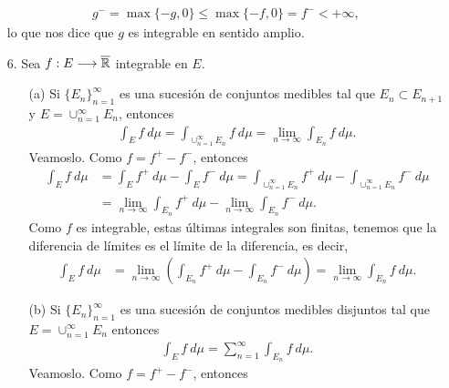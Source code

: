 \begin{obs}
\begin{enumerate}
              \begin{align*}
                  g^- = \max\{-g,0\} \leq \max\{-f,0\} = f^- < +\infty,
              \end{align*}
              lo que nos dice que $g$ es integrable en sentido amplio.
        \item[6.] Sea $f: E \longrightarrow \overline{\mathbb{R}}$ integrable en $E$.
              \begin{enumerate}
                  \item[(a)] Si $\{E_n\}_{n=1}^{\infty}$ es una sucesión de conjuntos medibles tal que $E_n \subset E_{n+1}$ y $E = \cup_{n=1}^{\infty}{E_n}$, entonces
                        \begin{align*}
                            \int_{E}{f \ d\mu} = \int_{\cup_{n=1}^{\infty}{E_n}}{f \ d\mu} =\lim_{n \to \infty}{\int_{E_n}{f \ d\mu}}.
                        \end{align*}
                        Veamoslo. Como $f = f^+ - f^-$, entonces
                        \begin{align*}
                            \int_{E}{f \ d\mu} & = \int_{E}{f^+ \ d\mu} - \int_{E}{f^- \ d\mu} = \int_{\cup_{n=1}^{\infty}{E_n}}{f^+ \ d\mu} - \int_{\cup_{n=1}^{\infty}{E_n}}{f^- \ d\mu} \\
                                               & = \lim_{n \to \infty}{\int_{E_n}{f^+ \ d\mu}} - \lim_{n \to \infty}{\int_{E_n}{f^- \ d\mu}}.
                        \end{align*}
                        Como $f$ es integrable, estas últimas integrales son finitas, tenemos que la diferencia de límites es el límite de la diferencia, es decir,
                        \begin{align*}
                            \int_{E}{f \ d\mu} & = \lim_{n \to \infty}{\left( \int_{E_n}{f^+ \ d\mu} - \int_{E_n}{f^- \ d\mu}\right)} = \lim_{n \to \infty}{\int_{E_n}{f \ d\mu}}.
                        \end{align*}
                  \item[(b)] Si $\{E_n\}_{n=1}^{\infty}$ es una sucesión de conjuntos medibles disjuntos tal que $E = \cup_{n=1}^{\infty}{E_n}$ entonces
                        \begin{align*}
                            \int_{E}{f \ d\mu} = \sum_{n=1}^{\infty}{\int_{E_n}{f \ d\mu}}.
                        \end{align*}
                        Veamoslo. Como $f = f^+ - f^-$, entonces
                        \begin{align*}

\end{align*}
\end{enumerate}
\end{enumerate}
\end{obs}
